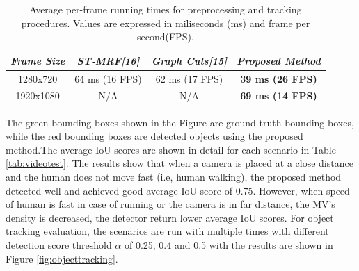 \begin{table}[]
\centering
\caption{Average per-frame running times for preprocessing and tracking procedures. Values are expressed in miliseconds (ms) and frame per second(FPS).}
\label{tab:timemessasure}
\begin{tabular}{|c|c|c|c|}
\hline
\textit{Frame Size} & \textit{ST-MRF{[}16{]}} & \textit{Graph Cuts{[}15{]}} & \textit{Proposed Method} \\ \hline
1280x720            & 64 ms (16 FPS)         & 62 ms (17 FPS)              & \textbf{39 ms (26 FPS)}  \\ \hline
1920x1080           & N/A                    & N/A                        & \textbf{69 ms (14 FPS)}  \\ \hline
\end{tabular}
\end{table}
The green bounding boxes shown in the Figure are ground-truth bounding boxes, while the red bounding boxes are detected objects using the proposed method.The average IoU scores are shown in detail for each scenario in Table \ref{tab:videotest}. The results show that when a camera is placed at a close distance and the human does not move fast (i.e, human walking), the proposed method detected well and achieved good average IoU score of 0.75. However, when speed of human is fast in case of running or the camera is in far distance, the MV's density is decreased, the detector return lower average IoU scores. For object tracking evaluation, the scenarios are run with multiple times with different detection score threshold $\alpha$ of 0.25, 0.4 and 0.5 with the results are shown in Figure  \ref{fig:objecttracking}. 
